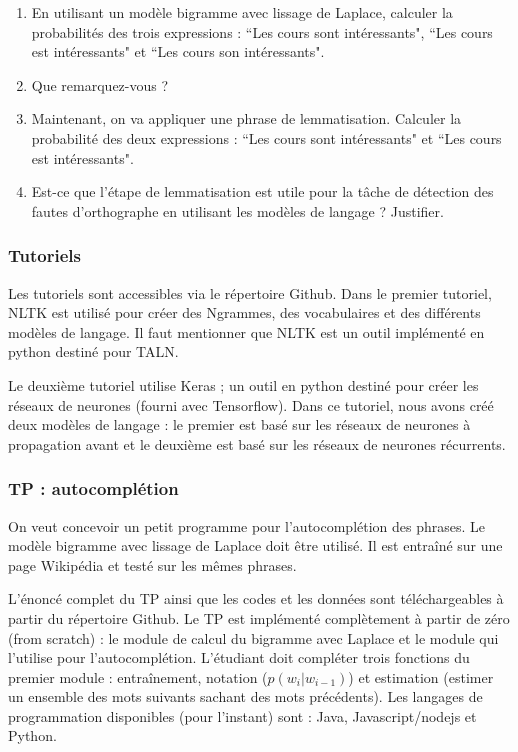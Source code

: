 \documentclass{KodeBook}
\begin{document}
\begin{enumerate}
	\begin{enumerate}
		\item En utilisant un modèle bigramme avec lissage de Laplace, calculer la probabilités des trois expressions : ``Les cours sont intéressants", ``Les cours est intéressants" et ``Les cours son intéressants".
		\item Que remarquez-vous ?
		\item Maintenant, on va appliquer une phrase de lemmatisation.
		Calculer la probabilité des deux expressions :  ``Les cours sont intéressants" et ``Les cours est intéressants".
		\item Est-ce que l'étape de lemmatisation est utile pour la tâche de détection des fautes d'orthographe en utilisant les modèles de langage ? Justifier.
	\end{enumerate}

\end{enumerate}

\subsubsection*{Tutoriels}

Les tutoriels sont accessibles via le répertoire Github.
Dans le premier tutoriel, NLTK est utilisé pour créer des Ngrammes, des vocabulaires et des différents modèles de langage.
Il faut mentionner que NLTK est un outil implémenté en python destiné pour TALN.

Le deuxième tutoriel utilise Keras ; un outil en python destiné pour créer les réseaux de neurones (fourni avec Tensorflow).
Dans ce tutoriel, nous avons créé deux modèles de langage : le premier est basé sur les réseaux de neurones à propagation avant et le deuxième est basé sur les réseaux de neurones récurrents.

\subsubsection*{TP : autocomplétion}

On veut concevoir un petit programme pour l'autocomplétion des phrases. 
Le modèle bigramme avec lissage de Laplace doit être utilisé.
Il est entraîné sur une page Wikipédia et testé sur les mêmes phrases.

L'énoncé complet du TP ainsi que les codes et les données sont téléchargeables à partir du répertoire Github.
Le TP est implémenté complètement à partir de zéro (from scratch) : le module de calcul du bigramme avec Laplace et le module qui l'utilise pour l'autocomplétion. 
L'étudiant doit compléter trois fonctions du premier module : entraînement, notation ($p(w_i|w_{i-1})$) et estimation (estimer un ensemble des mots suivants sachant des mots précédents).
Les langages de programmation disponibles (pour l'instant) sont : Java, Javascript/nodejs et Python.
\end{document}

